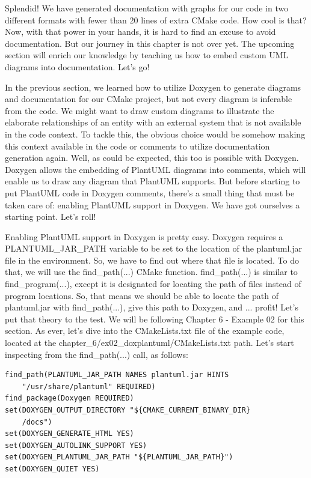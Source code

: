 Splendid! We have generated documentation with graphs for our code in two different formats with fewer than 20 lines of extra CMake code. How cool is that? Now, with that power in your hands, it is hard to find an excuse to avoid documentation. But our journey in this chapter is not over yet. The upcoming section will enrich our knowledge by teaching us how to embed custom UML diagrams into documentation. Let's go!
 

In the previous section, we learned how to utilize Doxygen to generate diagrams and documentation for our CMake project, but not every diagram is inferable from the code. We might want to draw custom diagrams to illustrate the elaborate relationships of an entity with an external system that is not available in the code context. To tackle this, the obvious choice would be somehow making this context available in the code or comments to utilize documentation generation again. Well, as could be expected, this too is possible with Doxygen. Doxygen allows the embedding of PlantUML diagrams into comments, which will enable us to draw any diagram that PlantUML supports. But before starting to put PlantUML code in Doxygen comments, there's a small thing that must be taken care of: enabling PlantUML support in Doxygen. We have got ourselves a starting point. Let's roll!

Enabling PlantUML support in Doxygen is pretty easy. Doxygen requires a PLANTUML\_JAR\_PATH variable to be set to the location of the plantuml.jar file in the environment. So, we have to find out where that file is located. To do that, we will use the find\_path(...) CMake function. find\_path(...) is similar to find\_program(...), except it is designated for locating the path of files instead of program locations. So, that means we should be able to locate the path of plantuml.jar with find\_path(...), give this path to Doxygen, and ... profit! Let's put that theory to the test. We will be following Chapter 6 - Example 02 for this section. As ever, let's dive into the CMakeLists.txt file of the example code, located at the chapter\_6/ex02\_doxplantuml/CMakeLists.txt path. Let's start inspecting from the find\_path(...) call, as follows:

\begin{lstlisting}[style=styleCMake]
find_path(PLANTUML_JAR_PATH NAMES plantuml.jar HINTS
	"/usr/share/plantuml" REQUIRED)
find_package(Doxygen REQUIRED)
set(DOXYGEN_OUTPUT_DIRECTORY "${CMAKE_CURRENT_BINARY_DIR}
	/docs")
set(DOXYGEN_GENERATE_HTML YES)
set(DOXYGEN_AUTOLINK_SUPPORT YES)
set(DOXYGEN_PLANTUML_JAR_PATH "${PLANTUML_JAR_PATH}")
set(DOXYGEN_QUIET YES)
\end{lstlisting}

